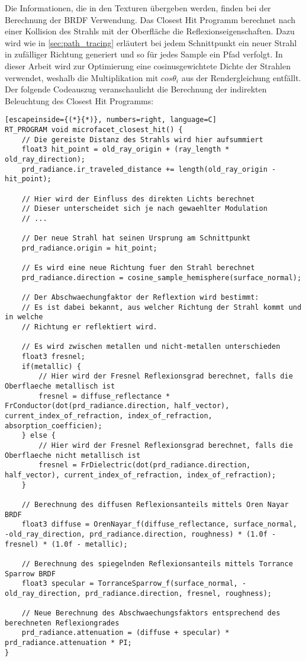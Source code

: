 \documentclass[thesis.tex]{subfiles}
\begin{document}
Die Informationen, die in den Texturen übergeben werden, finden bei der Berechnung der BRDF Verwendung. Das Closest Hit Programm berechnet nach einer Kollision des Strahls mit der Oberfläche die Reflexionseigenschaften. Dazu wird wie in \autoref{sec:path_tracing} erläutert bei jedem Schnittpunkt ein neuer Strahl in zufälliger Richtung generiert und so für jedes Sample ein Pfad verfolgt. In dieser Arbeit wird zur Optimierung eine cosinusgewichtete Dichte der Strahlen verwendet, weshalb die Multiplikation mit $cos \theta_i$ aus der Rendergleichung entfällt. Der folgende Codeauszug veranschaulicht die Berechnung der indirekten Beleuchtung des Closest Hit Programms:
%
\begin{lstlisting}[escapeinside={(*}{*)}, numbers=right, language=C]
RT_PROGRAM void microfacet_closest_hit() {
    // Die gereiste Distanz des Strahls wird hier aufsummiert
    float3 hit_point = old_ray_origin + (ray_length * old_ray_direction);
    prd_radiance.ir_traveled_distance += length(old_ray_origin - hit_point);

    // Hier wird der Einfluss des direkten Lichts berechnet
    // Dieser unterscheidet sich je nach gewaehlter Modulation
    // ...
    
    // Der neue Strahl hat seinen Ursprung am Schnittpunkt
    prd_radiance.origin = hit_point;

    // Es wird eine neue Richtung fuer den Strahl berechnet
    prd_radiance.direction = cosine_sample_hemisphere(surface_normal); 
    
    // Der Abschwaechungfaktor der Reflextion wird bestimmt:
    // Es ist dabei bekannt, aus welcher Richtung der Strahl kommt und in welche
    // Richtung er reflektiert wird.

    // Es wird zwischen metallen und nicht-metallen unterschieden
    float3 fresnel;
    if(metallic) {
        // Hier wird der Fresnel Reflexionsgrad berechnet, falls die Oberflaeche metallisch ist
        fresnel = diffuse_reflectance * FrConductor(dot(prd_radiance.direction, half_vector), current_index_of_refraction, index_of_refraction, absorption_coefficien);
    } else {
        // Hier wird der Fresnel Reflexionsgrad berechnet, falls die Oberflaeche nicht metallisch ist
        fresnel = FrDielectric(dot(prd_radiance.direction, half_vector), current_index_of_refraction, index_of_refraction);
    }

    // Berechnung des diffusen Reflexionsanteils mittels Oren Nayar BRDF
    float3 diffuse = OrenNayar_f(diffuse_reflectance, surface_normal, -old_ray_direction, prd_radiance.direction, roughness) * (1.0f - fresnel) * (1.0f - metallic);
    
    // Berechnung des spiegelnden Reflexionsanteils mittels Torrance Sparrow BRDF
    float3 specular = TorranceSparrow_f(surface_normal, -old_ray_direction, prd_radiance.direction, fresnel, roughness);

    // Neue Berechnung des Abschwaechungsfaktors entsprechend des berechneten Reflexiongrades
    prd_radiance.attenuation = (diffuse + specular) * prd_radiance.attenuation * PI;
}
\end{lstlisting}
\end{document}

